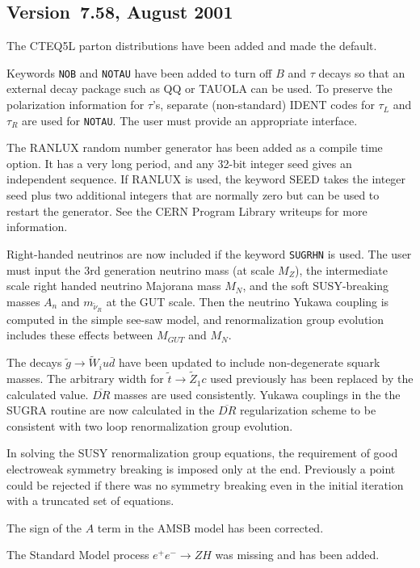 \subsection{Version~7.58, August 2001}

     The CTEQ5L parton distributions have been added and made the
default. 

     Keywords \verb|NOB| and \verb|NOTAU| have been added to turn off
$B$ and $\tau$ decays so that an external decay package such as QQ or
TAUOLA can be used. To preserve the polarization information for
$\tau$'s, separate (non-standard) IDENT codes for $\tau_L$ and $\tau_R$
are used for \verb|NOTAU|. The user must provide an appropriate
interface.

     The RANLUX random number generator has been added as a compile time
option. It has a very long period, and any 32-bit integer seed gives an
independent sequence. If RANLUX is used, the keyword SEED takes the
integer seed plus two additional integers that are normally zero but can
be used to restart the generator. See the CERN Program Library writeups
for more information.

     Right-handed neutrinos are now included if the keyword
\verb|SUGRHN| is used. The user must input the 3rd generation neutrino
mass (at scale $M_Z$), the intermediate scale right handed neutrino
Majorana mass $M_N$, and the soft SUSY-breaking masses $A_n$ and
$m_{\tilde\nu_R}$ at the GUT scale. Then the neutrino Yukawa coupling is
computed in the simple see-saw model, and renormalization group
evolution includes these effects between $M_{GUT}$ and $M_N$.

     The decays $\tilde g \to \tilde W_i u \bar d$ have been updated to
include non-degenerate squark masses. The arbitrary width for $\tilde t
\to \tilde Z_1 c$ used previously has been replaced by the calculated
value. $\overline{DR}$ masses are used consistently. Yukawa couplings in
the the SUGRA routine are now calculated in the $\overline{DR}$
regularization scheme to be consistent with two loop renormalization
group evolution.

     In solving the SUSY renormalization group equations, the
requirement of good electroweak symmetry breaking is imposed only at the
end. Previously a point could be rejected if there was no symmetry
breaking even in the initial iteration with a truncated set of
equations.

     The sign of the $A$ term in the AMSB model has been corrected.

     The Standard Model process $e^+e^- \to ZH$ was missing and has been
added.

